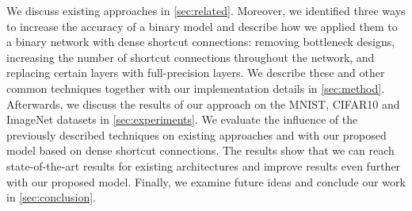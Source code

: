 \documentclass[10pt,twocolumn,letterpaper]{article}
\begin{document}

We discuss existing approaches in \autoref{sec:related}.
Moreover, we identified three ways to increase the accuracy of a binary model and describe how we applied them to a binary network with dense shortcut connections:
removing bottleneck designs, increasing the number of shortcut connections throughout the network, and replacing certain layers with full-precision layers.
We describe these and other common techniques together with our implementation details in \autoref{sec:method}.
Afterwards, we discuss the results of our approach on the MNIST, CIFAR10 and ImageNet datasets in \autoref{sec:experiments}.
We evaluate the influence of the previously described techniques on existing approaches and with our proposed model based on dense shortcut connections.
The results show that we can reach state-of-the-art results for existing architectures and improve results even further with our proposed model.
Finally, we examine future ideas and conclude our work in \autoref{sec:conclusion}.
\end{document}
